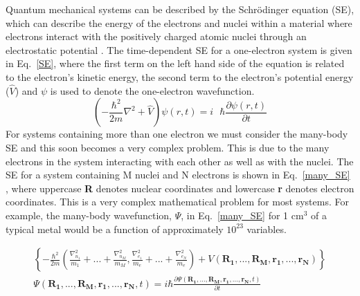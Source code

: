 \documentclass[11pt, twoside]{report}
\begin{document}
Quantum mechanical systems can be described by the Schr{\"o}dinger equation (SE), which can describe the energy of the electrons and nuclei within a material where electrons interact with the positively charged atomic nuclei through an electrostatic potential \cite{Lesar}. The time-dependent SE for a one-electron system is given in Eq.~\ref{SE}, where the first term on the left hand side of the equation is related to the electron's kinetic energy, the second term to the electron's potential energy ($\hat{V}$) and $\psi$ is used to denote the one-electron wavefunction.
\begin{equation} \label{SE}
\left( - \frac{\hbar^2}{2m} \nabla^2 + \hat{V} \right)\psi(r,t) = i\text{ } \hbar\frac{\partial \psi(r,t)}{\partial t}
\end{equation}
For systems containing more than one electron we must consider the many-body SE and this soon becomes a very complex problem. This is due to the many electrons in the system interacting with each other as well as with the nuclei. The SE for a system containing M nuclei and N electrons is shown in Eq.~\ref{many_SE} \cite{Lesar}, where uppercase \textbf{R} denotes nuclear coordinates and lowercase \textbf{r} denotes electron coordinates. This is a very complex mathematical problem for most systems. For example, the many-body wavefunction, $\Psi$, in Eq.~\ref{many_SE} for 1 cm$^3$ of a typical metal would be a function of approximately $10^{23}$ variables.

\begin{multline}  \label{many_SE}
\left\{ - \frac{\hbar^2}{2m} \left( \frac{\nabla_{n_1}^2}{m_1} + ... + \frac{\nabla_{n_M}^2}{m_M}, 
\frac{\nabla_{e_1}^2}{m_e} + ... + \frac{\nabla_{e_N}^2}{m_e} \right)
+ V \left( \mathbf{R_1},...,\mathbf{R_M}, \mathbf{r_1}, ..., \mathbf{r_N} \right)
\right\} \\
\Psi (\mathbf{R_1},...,\mathbf{R_M}, \mathbf{r_1}, ..., \mathbf{r_N}, t)
= i\hbar \frac{\partial\Psi(\mathbf{R_1},...,\mathbf{R_M}, \mathbf{r_1}, ..., \mathbf{r_N},t)}{\partial t}
\end{multline}
\end{document}
